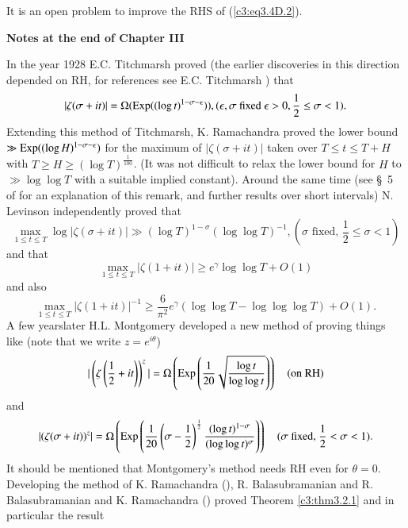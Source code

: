 \begin{remark*}
It is an open problem to improve the RHS of (\ref{c3:eq3.4D.2}).
\end{remark*}

\begin{center}
\textbf{Notes at the end of Chapter III}
\end{center}

In the year 1928 E.C. Titchmarsh \cite{Titchmarsh4} proved (the earlier discoveries in this direction depended on RH, for references see E.C. Titchmarsh \cite{Titchmarsh1}) that
$$
|\zeta(\sigma + it)| = \Omega (\operatorname{Exp} ((\log t)^{1-\sigma -\epsilon})), (\epsilon, \sigma \text{ fixed } \epsilon > 0, \frac{1}{2} \leq \sigma <1).
$$
Extending this method of Titchmarsh, K. Ramachandra \cite{Ramachandra6} proved the lower bound $\gg \operatorname{Exp} ((\log H)^{1-\sigma -\epsilon})$ for the maximum of $|\zeta (\sigma + it)|$ taken over $T \leq t \leq T + H$ with $T \geq H \geq (\log T)^{\frac{1}{100}}$. (It was not difficult to relax the lower bound for $H$ to $\gg  \log \log T$ with a suitable implied constant). Around the same time (see \S\ 5 of \cite{Ramachandra6} for an explanation of this remark, and further results over short intervals) N. Levinson \cite{Levinson1} independently proved that
$$
\max\limits_{1 \leq t \leq T} \log |\zeta(\sigma + it)| \gg (\log T)^{1-\sigma} (\log \log T)^{-1}, (\sigma \text{ fixed, } \frac{1}{2} \leq \sigma < 1)
$$
and that
$$
\max\limits_{1 \leq t \leq T} |\zeta(1+ it)| \geq e^{\gamma} \log \log T + O(1)
$$
and also
$$
\max\limits_{1\leq t \leq T} |\zeta(1+it)|^{-1} \geq \frac{6}{\pi^2} e^\gamma  (\log \log T - \log \log \log T) + O(1).
$$
A few years\pageoriginale later H.L. Montgomery \cite{Montgomery2} developed a new method of proving things like (note that we write $z = e^{i\theta}$)
$$
|\left(\zeta \left(\frac{1}{2} + it \right) \right)^z| = \Omega \left( \operatorname{Exp} \left( \frac{1}{20} \sqrt{\frac{\log t}{\log \log t}} \right)\right) \quad (\text{on  RH})
$$
and
{\fontsize{10}{12}\selectfont
\begin{equation*}
|(\zeta (\sigma + it))^z| = \Omega \left(\operatorname{Exp} \left( \frac{1}{20}
\left(\sigma - \frac{1}{2} \right)^{\frac{1}{2}} \frac{(\log
  t)^{1-\sigma}}{(\log \log t)^{\sigma}}\right) \right) \quad (\sigma
\text{ fixed, } \frac{1}{2} < \sigma < 1).  
\end{equation*}}
It should be mentioned that Montgomery's method needs RH even for $\theta =0$. Developing the method of K. Ramachandra (\cite{Ramachandra6}), R. Balasubramanian \cite{Balasubramanian1} and R. Balasubramanian and K. Ramachandra (\cite{Balasubramanian and Ramachandra6}) proved Theorem \ref{c3:thm3.2.1} and in particular the result
